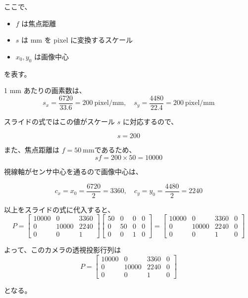 ﻿\documentclass[11pt,a4paper]{ltjsarticle}
\begin{document}
ここで、
\begin{itemize}
  \item $f$ は焦点距離
  \item $s$ は mm を pixel に変換するスケール
  \item $x_0,y_0$ は画像中心
\end{itemize}
を表す。

1 mm あたりの画素数は、
\[
s_x=\frac{6720}{33.6}=200\ \mathrm{pixel/mm},\quad
s_y=\frac{4480}{22.4}=200\ \mathrm{pixel/mm}
\]

スライドの式ではこの値がスケール $s$ に対応するので、

\[
s=200
\]

また、焦点距離は $f=50\ \mathrm{mm}$であるため、
\[
sf=200\times 50=10000
\]

視線軸がセンサ中心を通るので画像中心は、

\[
c_x=x_0=\frac{6720}{2}=3360,\quad
c_y=y_0=\frac{4480}{2}=2240
\]

以上をスライドの式に代入すると、
\[
P=
\begin{bmatrix}
10000 & 0 & 3360\\
0 & 10000 & 2240\\
0 & 0 & 1
\end{bmatrix}
\begin{bmatrix}
50 & 0 & 0 & 0\\
0 & 50 & 0 & 0\\
0 & 0 & 1 & 0
\end{bmatrix}
=
\begin{bmatrix}
10000 & 0 & 3360 & 0\\
0 & 10000 & 2240 & 0\\
0 & 0 & 1 & 0
\end{bmatrix}
\]

よって、このカメラの透視投影行列は
\[
\boxed{
P=
\begin{bmatrix}
10000 & 0 & 3360 & 0\\
0 & 10000 & 2240 & 0\\
0 & 0 & 1 & 0
\end{bmatrix}
}
\]

となる。
\end{document}
